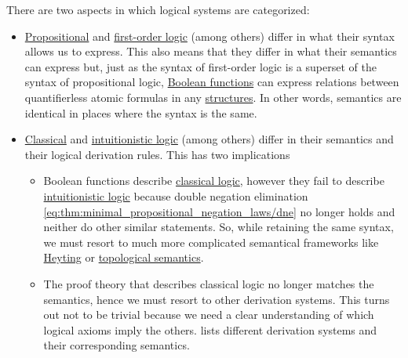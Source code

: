 There are two aspects in which logical systems are categorized:
\begin{itemize}
  \item \hyperref[subsec:propositional_logic]{Propositional} and \hyperref[subsec:first_order_logic]{first-order logic} (among others) differ in what their syntax allows us to express. This also means that they differ in what their semantics can express but, just as the syntax of first-order logic is a superset of the syntax of propositional logic, \hyperref[subsec:boolean_functions]{Boolean functions} can express relations between quantifierless atomic formulas in any \hyperref[def:first_order_structure]{structures}. In other words, semantics are identical in places where the syntax is the same.

  \item \hyperref[def:classical_logic]{Classical} and \hyperref[def:intuitionistic_logic]{intuitionistic logic} (among others) differ in their semantics and their logical derivation rules. This has two implications
  \begin{itemize}
     \item Boolean functions describe \hyperref[def:classical_logic]{classical logic}, however they fail to describe \hyperref[def:intuitionistic_logic]{intuitionistic logic} because double negation elimination \eqref{eq:thm:minimal_propositional_negation_laws/dne} no longer holds and neither do other similar statements. So, while retaining the same syntax, we must resort to much more complicated semantical frameworks like \hyperref[def:propositional_heyting_algebra_semantics]{Heyting} or \hyperref[def:propositional_topological_semantics]{topological semantics}.

     \item The proof theory that describes classical logic no longer matches the semantics, hence we must resort to other derivation systems. This turns out not to be trivial because we need a clear understanding of which logical axioms imply the others.  lists different derivation systems and their corresponding semantics.
  \end{itemize}
\end{itemize}

